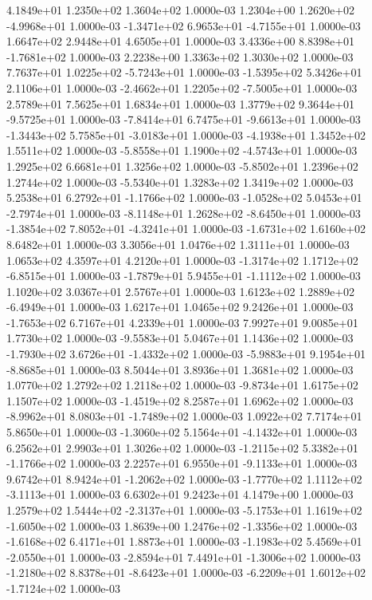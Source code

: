 4.1849e+01 1.2350e+02 1.3604e+02  1.0000e-03
 1.2304e+00  1.2620e+02 -4.9968e+01  1.0000e-03
-1.3471e+02  6.9653e+01 -4.7155e+01  1.0000e-03
1.6647e+02 2.9448e+01 4.6505e+01  1.0000e-03
 3.4336e+00  8.8398e+01 -1.7681e+02  1.0000e-03
2.2238e+00 1.3363e+02 1.3030e+02  1.0000e-03
 7.7637e+01  1.0225e+02 -5.7243e+01  1.0000e-03
-1.5395e+02  5.3426e+01  2.1106e+01  1.0000e-03
-2.4662e+01  1.2205e+02 -7.5005e+01  1.0000e-03
2.5789e+01 7.5625e+01 1.6834e+01  1.0000e-03
 1.3779e+02  9.3644e+01 -9.5725e+01  1.0000e-03
-7.8414e+01  6.7475e+01 -9.6613e+01  1.0000e-03
-1.3443e+02  5.7585e+01 -3.0183e+01  1.0000e-03
-4.1938e+01  1.3452e+02  1.5511e+02  1.0000e-03
-5.8558e+01  1.1900e+02 -4.5743e+01  1.0000e-03
1.2925e+02 6.6681e+01 1.3256e+02  1.0000e-03
-5.8502e+01  1.2396e+02  1.2744e+02  1.0000e-03
-5.5340e+01  1.3283e+02  1.3419e+02  1.0000e-03
 5.2538e+01  6.2792e+01 -1.1766e+02  1.0000e-03
-1.0528e+02  5.0453e+01 -2.7974e+01  1.0000e-03
-8.1148e+01  1.2628e+02 -8.6450e+01  1.0000e-03
-1.3854e+02  7.8052e+01 -4.3241e+01  1.0000e-03
-1.6731e+02  1.6160e+02  8.6482e+01  1.0000e-03
3.3056e+01 1.0476e+02 1.3111e+01  1.0000e-03
1.0653e+02 4.3597e+01 4.2120e+01  1.0000e-03
-1.3174e+02  1.1712e+02 -6.8515e+01  1.0000e-03
-1.7879e+01  5.9455e+01 -1.1112e+02  1.0000e-03
1.1020e+02 3.0367e+01 2.5767e+01  1.0000e-03
 1.6123e+02  1.2889e+02 -6.4949e+01  1.0000e-03
1.6217e+01 1.0465e+02 9.2426e+01  1.0000e-03
-1.7653e+02  6.7167e+01  4.2339e+01  1.0000e-03
7.9927e+01 9.0085e+01 1.7730e+02  1.0000e-03
-9.5583e+01  5.0467e+01  1.1436e+02  1.0000e-03
-1.7930e+02  3.6726e+01 -1.4332e+02  1.0000e-03
-5.9883e+01  9.1954e+01 -8.8685e+01  1.0000e-03
8.5044e+01 3.8936e+01 1.3681e+02  1.0000e-03
1.0770e+02 1.2792e+02 1.2118e+02  1.0000e-03
-9.8734e+01  1.6175e+02  1.1507e+02  1.0000e-03
-1.4519e+02  8.2587e+01  1.6962e+02  1.0000e-03
-8.9962e+01  8.0803e+01 -1.7489e+02  1.0000e-03
1.0922e+02 7.7174e+01 5.8650e+01  1.0000e-03
-1.3060e+02  5.1564e+01 -4.1432e+01  1.0000e-03
6.2562e+01 2.9903e+01 1.3026e+02  1.0000e-03
-1.2115e+02  5.3382e+01 -1.1766e+02  1.0000e-03
 2.2257e+01  6.9550e+01 -9.1133e+01  1.0000e-03
 9.6742e+01  8.9424e+01 -1.2062e+02  1.0000e-03
-1.7770e+02  1.1112e+02 -3.1113e+01  1.0000e-03
6.6302e+01 9.2423e+01 4.1479e+00  1.0000e-03
 1.2579e+02  1.5444e+02 -2.3137e+01  1.0000e-03
-5.1753e+01  1.1619e+02 -1.6050e+02  1.0000e-03
 1.8639e+00  1.2476e+02 -1.3356e+02  1.0000e-03
-1.6168e+02  6.4171e+01  1.8873e+01  1.0000e-03
-1.1983e+02  5.4569e+01 -2.0550e+01  1.0000e-03
-2.8594e+01  7.4491e+01 -1.3006e+02  1.0000e-03
-1.2180e+02  8.8378e+01 -8.6423e+01  1.0000e-03
-6.2209e+01  1.6012e+02 -1.7124e+02  1.0000e-03
